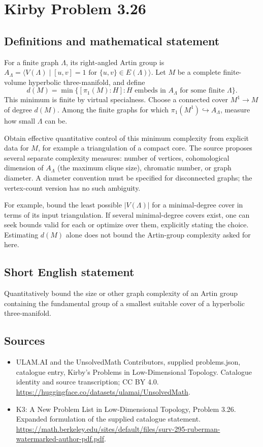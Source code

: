 \documentclass[11pt,a4paper]{article}
\begin{document}
\section*{Kirby Problem 3.26}\label{statement}

\subsection{Definitions and mathematical statement}
For a finite graph $\Lambda$, its right-angled Artin group is
$A_\Lambda=\langle V(\Lambda)\mid [u,v]=1\text{ for }\{u,v\}\in E(\Lambda)\rangle$.
Let $M$ be a complete finite-volume hyperbolic three-manifold, and define
\[
 d(M)=\min\{[\pi_1(M):H]:H\text{ embeds in }A_\Lambda
                    \text{ for some finite }\Lambda\}.
\]
This minimum is finite by virtual specialness. Choose a connected cover
$M^1\to M$ of degree $d(M)$. Among the finite graphs for which
$\pi_1(M^1)\hookrightarrow A_\Lambda$, measure how small $\Lambda$ can be.

Obtain effective quantitative control of this minimum complexity from
explicit data for $M$, for example a triangulation of a compact core. The
source proposes several separate complexity measures: number of vertices,
cohomological dimension of $A_\Lambda$ (the maximum clique size), chromatic
number, or graph diameter. A diameter convention must be specified for
disconnected graphs; the vertex-count version has no such ambiguity.

For example, bound the least possible $|V(\Lambda)|$ for a minimal-degree
cover in terms of its input triangulation. If several minimal-degree covers
exist, one can seek bounds valid for each or optimize over them, explicitly
stating the choice. Estimating $d(M)$ alone does not bound the Artin-group
complexity asked for here.
\subsection{Short English statement}
Quantitatively bound the size or other graph complexity of an Artin group containing the fundamental group of a smallest suitable cover of a hyperbolic three-manifold.
\subsection{Sources}
\begin{itemize}
\item[S1] ULAM.AI and the UnsolvedMath Contributors, supplied problems.json, catalogue entry, Kirby's Problems in Low-Dimensional Topology. Catalogue identity and source transcription; CC BY 4.0.
\url{https://huggingface.co/datasets/ulamai/UnsolvedMath}.
\item[S2] K3: A New Problem List in Low-Dimensional Topology, Problem 3.26. Expanded formulation of the supplied catalogue statement.
\url{https://math.berkeley.edu/sites/default/files/surv-295-ruberman-watermarked-author-pdf.pdf}.
\end{itemize}
\end{document}

